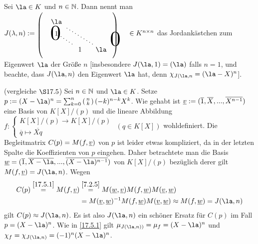 \documentclass[../../main.tex]{subfiles}
\begin{document}
\begin{df}\label{17.7.1}
Sei $\la\in K$ und $n\in \mathbb N$. Dann nennt man\\ $J(\lambda, n):=\begin{tikzpicture}[loosely dotted,thick,baseline]
\matrix (m) [matrix of math nodes,nodes in empty cells,right delimiter=),left delimiter=(,column sep=1em]{
\tikz\node(a){$\la$};&&\\
1\\
\\
&\tikz\node(b){$1$};&\la\\
} ;
\draw (m-1-1)-- (m-4-3);
\draw (m-2-1)-- (m-4-2);
\node[scale=3, xshift=0.5cm, yshift=-0.1cm] at (a.east) {$0$};
\node[scale=3, xshift=-0.3cm, yshift=0.0cm] at (b.west) {$0$};
\end{tikzpicture}\in K^{n\times n}$ das Jordankästchen zum Eigenwert $\la$ der Größe $n$ [insbesondere $J(\la,1)=(\la)$ falls $n=1$, und beachte, dass $J(\la,n)$ den Eigenwert $\la$ hat, denn $\chi_{J(\la, n}=(\la-X)^n$].
\end{df}

\begin{bem}
(vergleiche $\S 17.5$) Sei $n\in \mathbb N$ und $\la\in K$. Setze $p:=(X-\la)^n=\sum_{k=0}^n\cvec{n\\k}(-k)^{n-k}X^k$. Wie gehabt ist ${\underline v}:=(\overline{1}, \overline{X},...,\overline{X^{n-1}})$ eine Basis von $K[X]/(p)$ und die lineare Abbildung $f:\begin{cases}K[X]/(p)\to K[X]/(p)\\ \overline{q}\mapsto \overline{Xq}\end{cases}$ $(q\in K[X])$ wohldefiniert. Die Begleitmatrix $C(p)=M(f,{\underline v})$ von $p$ ist leider etwas kompliziert, da in der letzten Spalte die Koeffizienten von $p$ eingehen. Daher betrachtete man die Basis $\w=(\overline{1},\overline{X-\la},...,\overline{(X-\la)^{n-1}})$ von $K[X]/(p)$ bezüglich derer gilt $M(f,\v)=J(\la,n)$. Wegen
\begin{align*}
C(p)\stackrel{\ref{17.5.1}}{=}M(f,\v)&\stackrel{\ref{7.2.5}}{=}M(\w,\v)M(f,\w)M(\v,\w)\\
&=M(\v,\w)^{-1}M(f,\w)M(\v,\w)\approx M(f,\w)=J(\la, n)
\end{align*}
gilt $C(p)\approx J(\la,n)$. Es ist also $J(\la,n)$ ein schöner Ersatz für $C(p)$ im Fall $p=(X-\la)^n$. Wie in \ref{17.5.1} gilt $\mu_{J(\la,n))}=\mu_f=(X-\la)^n$ und $\chi_f=\chi_{J(\la,n)}=(-1)^n(X-\la)^n$.
\end{bem}
\end{document}
